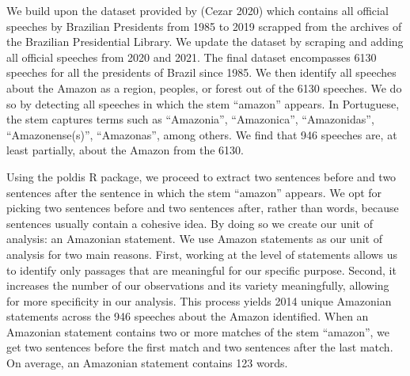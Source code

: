 \documentclass[
]{article}
\begin{document}
We build upon the dataset provided by (Cezar 2020) which contains all
official speeches by Brazilian Presidents from 1985 to 2019 scrapped
from the archives of the Brazilian Presidential Library. We update the
dataset by scraping and adding all official speeches from 2020 and 2021.
The final dataset encompasses 6130 speeches for all the presidents of
Brazil since 1985. We then identify all speeches about the Amazon as a
region, peoples, or forest out of the 6130 speeches. We do so by
detecting all speeches in which the stem ``amazon'' appears. In
Portuguese, the stem captures terms such as ``Amazonia'', ``Amazonica'',
``Amazonidas'', ``Amazonense(s)'', ``Amazonas'', among others. We find
that 946 speeches are, at least partially, about the Amazon from the
6130.

Using the poldis R package, we proceed to extract two sentences before
and two sentences after the sentence in which the stem ``amazon''
appears. We opt for picking two sentences before and two sentences
after, rather than words, because sentences usually contain a cohesive
idea. By doing so we create our unit of analysis: an Amazonian
statement. We use Amazon statements as our unit of analysis for two main
reasons. First, working at the level of statements allows us to identify
only passages that are meaningful for our specific purpose. Second, it
increases the number of our observations and its variety meaningfully,
allowing for more specificity in our analysis. This process yields 2014
unique Amazonian statements across the 946 speeches about the Amazon
identified. When an Amazonian statement contains two or more matches of
the stem ``amazon'', we get two sentences before the first match and two
sentences after the last match. On average, an Amazonian statement
contains 123 words.
\end{document}
